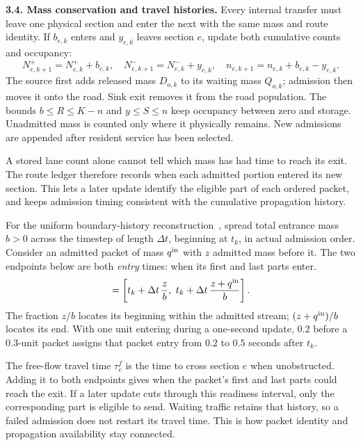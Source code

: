 \documentclass[10pt,a4paper]{article}
\newenvironment{revision}{\begingroup\color{revisionred}}{\par\endgroup}
\begin{document}
\textbf{3.4. Mass conservation and travel histories.}
Every internal transfer must leave one physical section and enter the
next with the same mass and route identity. If $b_{e,k}$ enters and
$y_{e,k}$ leaves section $e$, update both cumulative counts and occupancy:
\begin{equation}
 N^+_{e,k+1}=N^+_{e,k}+b_{e,k},\quad
 N^-_{e,k+1}=N^-_{e,k}+y_{e,k},\quad
 n_{e,k+1}=n_{e,k}+b_{e,k}-y_{e,k}.
 \label{eq:compact-update}
\end{equation}
The source first adds released mass $D_{o,k}$ to its waiting mass $Q_{o,k}$;
admission then moves it onto the road. Sink exit removes it from the
road population. The bounds $b\leq R\leq K-n$ and $y\leq S\leq n$
keep occupancy between zero and storage. Unadmitted mass is counted
only where it physically remains. New admissions are appended after
resident service has been selected.

\begin{revision}
A stored lane count alone cannot tell which mass has had time to reach
its exit. The route ledger therefore records when each admitted portion
entered its new section. This lets a later update identify the eligible
part of each ordered packet, and keeps admission timing consistent with
the cumulative propagation history.

For the uniform boundary-history reconstruction~\cite{m1}, spread total
entrance mass $b>0$ across the timestep of length $\Delta t$, beginning at
$t_k$, in actual admission order. Consider an admitted packet of mass
$q^{\rm in}$ with $z$ admitted mass before it. The two endpoints below
are both \emph{entry} times: when its first and last parts enter.
\begin{equation}
 [t^{\rm in}_{\rm front},t^{\rm in}_{\rm tail}]
 =\left[t_k+\Delta t\,\frac z b,\
       t_k+\Delta t\,\frac{z+q^{\rm in}}b\right].
 \label{eq:compact-entry}
\end{equation}
The fraction $z/b$ locates its beginning within the admitted stream;
$(z+q^{\rm in})/b$ locates its end. With one unit entering during a
one-second update, $0.2$ before a $0.3$-unit packet assigns that packet
entry from $0.2$ to $0.5$ seconds after $t_k$.

The free-flow travel time $\tau^f_e$ is the time to cross section $e$
when unobstructed. Adding it to both endpoints gives when the packet's
first and last parts could reach the exit. If a later update cuts through
this readiness interval, only the corresponding part is eligible to send.
Waiting traffic retains that history, so a failed admission does not
restart its travel time. This is how packet identity and propagation
availability stay connected.
\end{revision}
\end{document}
